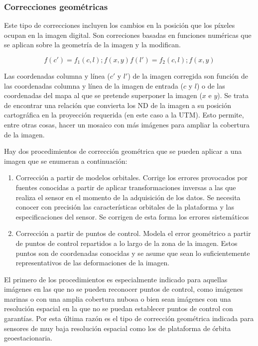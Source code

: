 \subsubsection{Correcciones geométricas}
Este tipo de correcciones incluyen los cambios en la posición que los píxeles ocupan en la imagen digital. Son correciones basadas en funciones numéricas que se aplican sobre la geometría de la imagen y la modifican.\Sep

\begin{equation}
	f(c')=f_{1}(c,l) ; f(x,y)
	f(l')=f_{2}(c,l) ; f(x,y)
	\label{eq:correcgeom}
\end{equation}\Sep

Las coordenadas columna y línea ($c'$ y $l'$) de la imagen corregida son función de las coordenadas columna y línea de la imagen de entrada ($c$ y $l$) o de las coordenadas del mapa al que se pretende superponer la imagen ($x$ e $y$). Se trata de encontrar una relación que convierta los \ac{ND} de la imagen a su posición cartográfica en la proyección requerida (en este caso a la \ac{UTM}). Esto permite, entre otras cosas, hacer un mosaico con más imágenes para ampliar la cobertura de la imagen.\Sep

Hay dos procedimientos de corrección geométrica que se pueden aplicar a una imagen que se enumeran a continuación:

\begin{enumerate}
	\item Corrección a partir de modelos orbitales. Corrige los errores provocados por fuentes conocidas a partir de aplicar transformaciones inversas a las que realiza el sensor en el momento de la adquisición de los datos. Se necesita conocer con precisión las características orbitales de la plataforma y las especificaciones del sensor. Se corrigen de esta forma los errores sistemáticos
	\item Corrección a partir de puntos de control. Modela el error geométrico a partir de puntos de control repartidos a lo largo de la zona de la imagen. Estos puntos son de coordenadas conocidas y se asume que sean lo suficientemente representativos de las deformaciones de la imagen.
\end{enumerate}

El primero de los procedimientos es especialmente indicado para aquellas imágenes en las que no se pueden reconocer puntos de control, como imágenes marinas o con una amplia cobertura nubosa o bien sean imágenes con una resolución espacial en la que no se puedan establecer puntos de control con garantías. Por esta última razón es el tipo de corrección geométrica indicada para sensores de muy baja resolución espacial como los de plataforma de órbita geoestacionaria.\Sep

